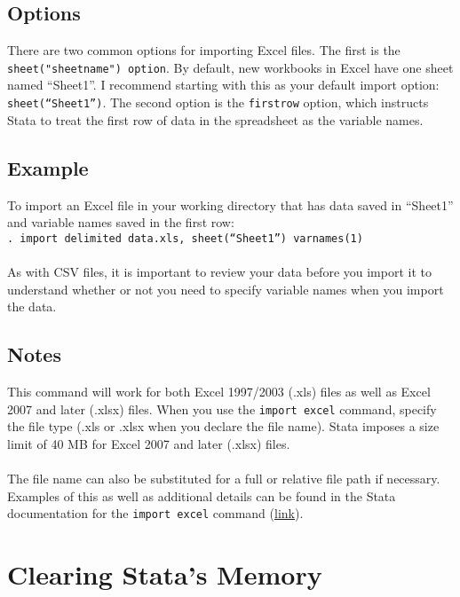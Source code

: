 \documentclass[letterpaper,11pt]{article}
\begin{document}
\subsection{Options}
There are two common options for importing Excel files. The first is the \texttt{sheet("sheetname") option}. By default, new workbooks in Excel have one sheet named ``Sheet1''. I recommend starting with this as your default import option: \texttt{sheet(``Sheet1'')}. The second option is the \texttt{firstrow} option, which instructs Stata to treat the first row of data in the spreadsheet as the variable names. \\

\subsection{Example}
To import an Excel file in your working directory that has data saved in ``Sheet1'' and variable names saved in the first row: \\
\texttt{. {\color{Red}import delimited} data.xls, sheet(``Sheet1'') varnames(1)}  \\
\\
As with CSV files, it is important to review your data before you import it to understand whether or not you need to specify variable names when you import the data. \\

\subsection{Notes}
This command will work for both Excel 1997/2003 (.xls) files as well as Excel 2007 and later (.xlsx) files. When you use the \texttt{{\color{Red}import excel}} command, specify the file type (.xls or .xlsx when you declare the file name). Stata imposes a size limit of 40 MB for Excel 2007 and later (.xlsx) files. \\
\\
The file name can also be substituted for a full or relative file path if necessary. Examples of this as well as additional details can be found in the Stata documentation for the \texttt{{\color{Red}import excel}} command (\href{http://www.stata.com/manuals14/dimportexcel.pdf}{link}).\\
\newpage
\section{Clearing Stata's Memory}
\end{document}
